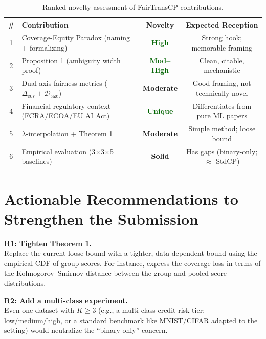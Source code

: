 \documentclass[11pt,a4paper]{article}
\begin{document}
\begin{table}[htbp]
\centering
\small
\caption{Ranked novelty assessment of FairTransCP contributions.}
\label{tab:novelty_ranked}
\begin{tabularx}{\textwidth}{@{}c>{\raggedright\arraybackslash}Xcc@{}}
\toprule
\textbf{\#} & \textbf{Contribution} & \textbf{Novelty} & \textbf{Expected Reception} \\
\midrule
1 & Coverage-Equity Paradox (naming + formalizing) & \textcolor{darkgreen}{\textbf{High}} & Strong hook; memorable framing \\
2 & Proposition 1 (ambiguity width proof) & \textcolor{darkgreen}{\textbf{Mod--High}} & Clean, citable, mechanistic \\
3 & Dual-axis fairness metrics ($\Delta_{\text{cov}} + \mathcal{D}_{\text{size}}$) & \textcolor{warnorange}{\textbf{Moderate}} & Good framing, not technically novel \\
4 & Financial regulatory context (FCRA/ECOA/EU AI Act) & \textcolor{darkgreen}{\textbf{Unique}} & Differentiates from pure ML papers \\
5 & $\lambda$-interpolation + Theorem 1 & \textcolor{warnorange}{\textbf{Moderate}} & Simple method; loose bound \\
6 & Empirical evaluation (3$\times$3$\times$5 baselines) & \textcolor{warnorange}{\textbf{Solid}} & Has gaps (binary-only; $\approx$ StdCP) \\
\bottomrule
\end{tabularx}
\end{table}

\section{Actionable Recommendations to Strengthen the Submission}
\label{sec:recommendations}

\begin{recommendbox}
\textbf{R1: Tighten Theorem 1.} \\
Replace the current loose bound with a tighter, data-dependent bound using the empirical CDF of group scores. For instance, express the coverage loss in terms of the Kolmogorov--Smirnov distance between the group and pooled score distributions.
\end{recommendbox}

\begin{recommendbox}
\textbf{R2: Add a multi-class experiment.} \\
Even one dataset with $K \ge 3$ (e.g., a multi-class credit risk tier: low/medium/high, or a standard benchmark like MNIST/CIFAR adapted to the setting) would neutralize the ``binary-only'' concern.
\end{recommendbox}
\end{document}
